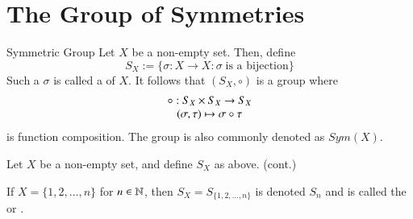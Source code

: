 \documentclass[12pt, a4paper, twoside, openright, titlepage]{book}
\begin{document}
\section{\textsection The Group of Symmetries}

\begin{defn}{Symmetric Group}{}
    Let $X$ be a non-empty set. Then, define \begin{equation}
        S_X:=\{\sigma:X\rightarrow X:\sigma\;\text{is a bijection}\}
    \end{equation}
    Such a $\sigma$ is called a  of $X$. It follows that $(S_X, \circ)$ is a group where \begin{equation}
        \begin{array}{c} \circ:S_X\times S_X\rightarrow S_X \\ (\sigma,\tau)\mapsto \sigma \circ \tau \end{array}
    \end{equation}
    is function composition. The group is also commonly denoted as $Sym(X)$.
    \begin{proof*}{}{}
        Let $X$ be a non-empty set, and define $S_X$ as above. (cont.)
    \end{proof*}
\end{defn}

\begin{defn}{}{}
    If $X = \{1,2,...,n\}$ for $n \in \mathbb N$, then $S_X = S_{\{1,2,...,n\}}$ is denoted $S_n$ and is called the  or .
\end{defn}
\end{document}
